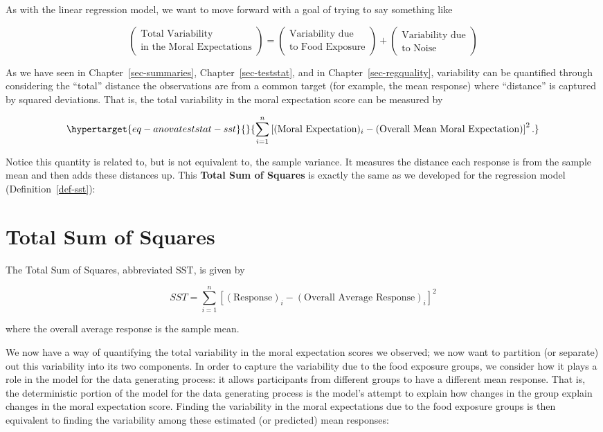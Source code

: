 \documentclass[
  letterpaper,
  DIV=11,
  numbers=noendperiod]{scrreprt}
\theoremstyle{plain}
\theoremstyle{definition}
\theoremstyle{definition}
\theoremstyle{remark}
\begin{document}
As with the linear regression model, we want to move forward with a goal
of trying to say something like

\[\begin{pmatrix} \text{Total Variability} \\ \text{in the Moral Expectations} \end{pmatrix} = \begin{pmatrix} \text{Variability due} \\ \text{to Food Exposure} \end{pmatrix} + \begin{pmatrix} \text{Variability due} \\ \text{to Noise} \end{pmatrix}\]

As we have seen in Chapter~\ref{sec-summaries},
Chapter~\ref{sec-teststat}, and in Chapter~\ref{sec-regquality},
variability can be quantified through considering the ``total'' distance
the observations are from a common target (for example, the mean
response) where ``distance'' is captured by squared deviations. That is,
the total variability in the moral expectation score can be measured by

\begin{equation}\protect\hypertarget{eq-anovateststat-sst}{}{\sum_{i=1}^{n} \left[(\text{Moral Expectation})_i - (\text{Overall Mean Moral Expectation})\right]^2.}\label{eq-anovateststat-sst}\end{equation}

Notice this quantity is related to, but is not equivalent to, the sample
variance. It measures the distance each response is from the sample mean
and then adds these distances up. This \textbf{Total Sum of Squares} is
exactly the same as we developed for the regression model
(Definition~\ref{def-sst}):

\hypertarget{total-sum-of-squares-1}{%
\section{Total Sum of Squares}\label{total-sum-of-squares-1}}

The Total Sum of Squares, abbreviated SST, is given by

\[SST = \sum_{i=1}^{n} \left[(\text{Response})_i - (\text{Overall Average Response})_i\right]^2\]

where the overall average response is the sample mean.

We now have a way of quantifying the total variability in the moral
expectation scores we observed; we now want to partition (or separate)
out this variability into its two components. In order to capture the
variability due to the food exposure groups, we consider how it plays a
role in the model for the data generating process: it allows
participants from different groups to have a different mean response.
That is, the deterministic portion of the model for the data generating
process is the model's attempt to explain how changes in the group
explain changes in the moral expectation score. Finding the variability
in the moral expectations due to the food exposure groups is then
equivalent to finding the variability among these estimated (or
predicted) mean responses:
\end{document}
